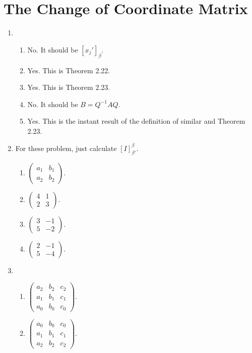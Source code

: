 \section{The Change of Coordinate Matrix}
\begin{enumerate}
\item \begin{enumerate}
\item No. It should be $[x_j']_{\beta}$.
\item Yes. This is Theorem 2.22.
\item Yes. This is Theorem 2.23.
\item No. It should be $B=Q^{-1}AQ$.
\item Yes. This is the instant result of the definition of similar and Theorem 2.23.
\end{enumerate}
\item For these problem, just calculate $[I]_{\beta'}^{\beta}$.\begin{enumerate}
\item $\left(\begin{array}{cc}a_1&b_1\\a_2&b_2\end{array}\right).$
\item $\left(\begin{array}{cc}4&1\\2&3\end{array}\right).$
\item $\left(\begin{array}{cc}3&-1\\5&-2\end{array}\right).$
\item $\left(\begin{array}{cc}2&-1\\5&-4\end{array}\right).$
\end{enumerate}
\item \begin{enumerate}
\item $\left(\begin{array}{ccc}a_2&b_2&c_2\\a_1&b_1&c_1\\a_0&b_0&c_0\end{array}\right).$
\item $\left(\begin{array}{ccc}a_0&b_0&c_0\\a_1&b_1&c_1\\a_2&b_2&c_2\end{array}\right).$

\end{enumerate}
\end{enumerate}
